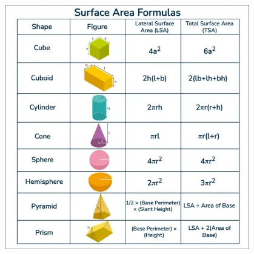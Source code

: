 \documentclass{article}
\begin{document}
\begin{center}
\begin{minipage}{\linewidth}
    \centering
    \includegraphics[width=0.8\textwidth]{imgs/Surface-Area-Formulas.png}
\end{minipage}
\end{center}
\newpage
\end{document}
